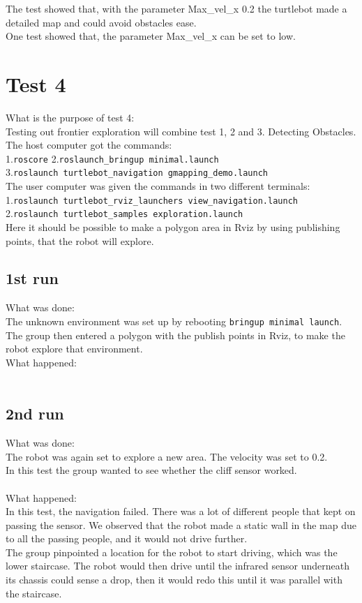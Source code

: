 The test showed that, with the parameter Max\_vel\_x 0.2 the turtlebot made a detailed map and could avoid obstacles ease.\\
One test showed that, the parameter Max\_vel\_x can be set to low.\\

\section{Test 4} 
What is the purpose of test 4:\\
Testing out frontier exploration will combine test 1, 2 and 3. Detecting Obstacles.\\ The host computer got the commands:\\
1.\texttt{roscore} 
2.\texttt{roslaunch\_bringup minimal.launch}\\
3.\texttt{roslaunch turtlebot\_navigation gmapping\_demo.launch}\\
The user computer was given the commands in two different terminals:\\
1.\texttt{roslaunch turtlebot\_rviz\_launchers view\_navigation.launch}\\
2.\texttt{roslaunch turtlebot\_samples exploration.launch}\\
Here it should be possible to make a polygon area in Rviz by using publishing points, that the robot will explore.\\

\subsection{1st run}
What was done:\\
The unknown environment was set up by rebooting \texttt{bringup minimal launch}.\\ 
The group then entered a polygon with the publish points in Rviz, to make the robot explore that environment.
\\
What happened:\\

\\
\subsection{2nd run}
What was done:\\
The robot was again set to explore a new area. The velocity was set to 0.2.\\
In this test the group wanted to see whether the cliff sensor worked.\\
\\
What happened:\\
In this test, the navigation failed. There was a lot of different people that kept on passing the sensor. We observed that the robot made a static wall in the map due to all the passing people, and it would not drive further.\\
The group pinpointed a location for the robot to start driving, which was the lower staircase. The robot would then drive until the infrared sensor underneath its chassis could sense a drop, then it would redo this until it was parallel with the staircase.\\
\\
